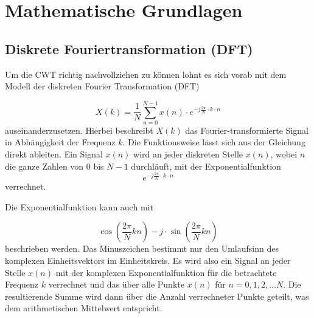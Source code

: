 %
%
%
%
\section{Mathematische Grundlagen
\label{wavelets:section:teil1}}

\subsection{Diskrete Fouriertransformation (DFT)
\label{wavelets:subsection:DFT}}
Um die CWT richtig nachvollziehen zu können lohnt es sich vorab mit dem Modell der diskreten Fourier Transformation (DFT)

\begin{equation}
	X(k)=\frac{1}{N}\sum_{n=0}^{N-1}x(n)\cdot e^{-j\frac{2\pi}{N}\cdot k\cdot n}
	\label{wavelets:equation1}
\end{equation}
auseinanderzusetzen. Hierbei beschreibt $X(k)$  das Fourier-transformierte Signal in Abhängigkeit der Frequenz $k$.
Die Funktionsweise lässt sich aus der Gleichung direkt ableiten.
Ein Signal $x(n)$ wird an jeder diskreten Stelle $x(n)$, wobei $n$ die ganze Zahlen von $0$ bis $N-1$ durchläuft, mit der Exponentialfunktion \[e^{-j\frac{2\pi}{N}\cdot k\cdot n}\] verrechnet.

Die Exponentialfunktion kann auch mit

\begin{equation}
	\cos \left( \frac{2\pi}{N}kn \right) -j\cdot \sin \left( \frac{2\pi}{N}kn \right)
	\label{wavelets:equation2}
\end{equation} 
beschrieben werden. Das Minuszeichen bestimmt nur den Umlaufsinn des komplexen Einheitsvektors im Einheitskreis.
Es wird also ein Signal an jeder Stelle $x(n)$ mit der komplexen Exponentialfunktion für die betrachtete Frequenz $k$ verrechnet und das über alle Punkte $x(n)$ für $n=0,1,2,...N$. Die resultierende Summe wird dann über die Anzahl verrechneter Punkte geteilt, was dem arithmetischen Mittelwert entspricht.

